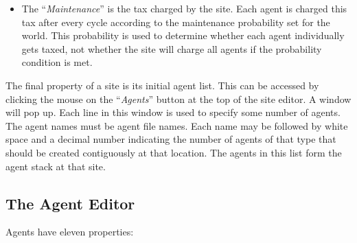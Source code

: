 \begin{itemize}
\item
The ``{\sl Maintenance}''   is the
tax charged by the site. Each agent is charged this tax after every
cycle according to the maintenance probability set for the world. This
probability is used to determine whether each agent individually gets
taxed, not whether the site will charge all agents if the probability
condition is met.

\end{itemize}

The final property of a site is its initial agent list. This can be
accessed by clicking the mouse on the ``{\sl Agents}''   button at the top of the
site editor. A window will pop up. Each line in this window is used to
specify some number of agents. The agent names must be agent file
names. Each name may be followed by white space and a decimal number
indicating the number of agents of that type that should be created
contiguously at that location. The agents in this list form the agent
stack at that site.

\subsection{The Agent Editor}
\label{agent-editor}

Agents have eleven properties:

